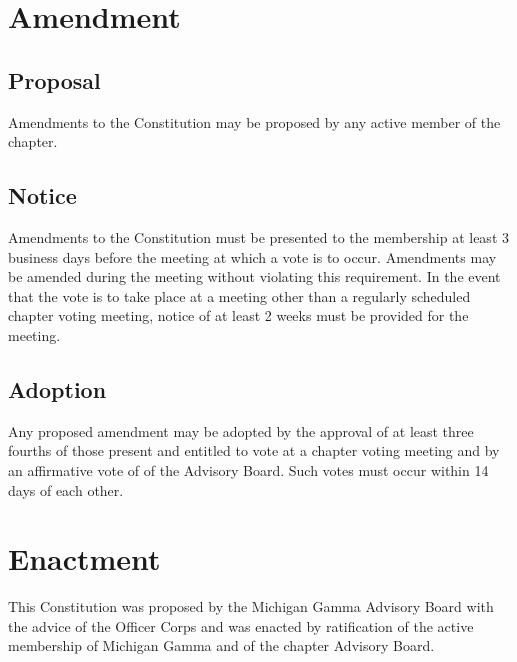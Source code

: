 \chapter{Amendment}
\section{Proposal} Amendments to the Constitution may be proposed by any active member of the chapter.

\section{Notice} Amendments to the Constitution must be presented to the membership at least 3 business days before the meeting at which a vote is to occur. Amendments may be amended during the meeting without violating this requirement. In the event that the vote is to take place at a meeting other than a regularly scheduled chapter voting meeting, notice of at least 2 weeks must be provided for the meeting.

\section{Adoption} Any proposed amendment may be adopted by the approval of at least three fourths of those present and entitled to vote at a chapter voting meeting and by an affirmative vote of   of the Advisory Board. Such votes must occur within 14 days of each other.

\chapter{Enactment}
This Constitution was proposed by the Michigan Gamma Advisory Board with the advice of the Officer Corps and was enacted \dateapproved by ratification of the active membership of Michigan Gamma and of the chapter Advisory Board.